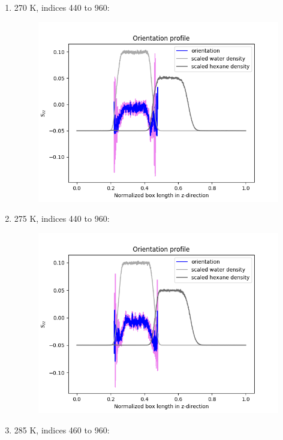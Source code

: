 \documentclass[12pt,reqno]{amsart}
\numberwithin{equation}{section}
\begin{document}
\begin{enumerate}
\item 270 K, indices 440 to 960:  

\begin{figure}[H]
\centering
\includegraphics[scale=0.6]{full-270-32bead-water-orientation}
\end{figure}

\item 275 K, indices 440 to 960:  

\begin{figure}[H]
\centering
\includegraphics[scale=0.6]{full-275-32bead-water-orientation}
\end{figure}

\item 285 K, indices 460 to 960:  


\end{enumerate}
\end{document}
